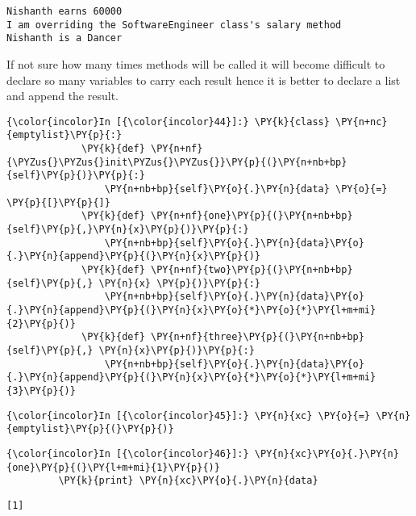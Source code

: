    \begin{Verbatim}[commandchars=\\\{\}]
Nishanth earns 60000
I am overriding the SoftwareEngineer class's salary method
Nishanth is a Dancer
    \end{Verbatim}

    If not sure how many times methods will be called it will become
difficult to declare so many variables to carry each result hence it is
better to declare a list and append the result.

    \begin{Verbatim}[commandchars=\\\{\}]
{\color{incolor}In [{\color{incolor}44}]:} \PY{k}{class} \PY{n+nc}{emptylist}\PY{p}{:}
             \PY{k}{def} \PY{n+nf}{\PYZus{}\PYZus{}init\PYZus{}\PYZus{}}\PY{p}{(}\PY{n+nb+bp}{self}\PY{p}{)}\PY{p}{:}
                 \PY{n+nb+bp}{self}\PY{o}{.}\PY{n}{data} \PY{o}{=} \PY{p}{[}\PY{p}{]}
             \PY{k}{def} \PY{n+nf}{one}\PY{p}{(}\PY{n+nb+bp}{self}\PY{p}{,}\PY{n}{x}\PY{p}{)}\PY{p}{:}
                 \PY{n+nb+bp}{self}\PY{o}{.}\PY{n}{data}\PY{o}{.}\PY{n}{append}\PY{p}{(}\PY{n}{x}\PY{p}{)}
             \PY{k}{def} \PY{n+nf}{two}\PY{p}{(}\PY{n+nb+bp}{self}\PY{p}{,} \PY{n}{x} \PY{p}{)}\PY{p}{:}
                 \PY{n+nb+bp}{self}\PY{o}{.}\PY{n}{data}\PY{o}{.}\PY{n}{append}\PY{p}{(}\PY{n}{x}\PY{o}{*}\PY{o}{*}\PY{l+m+mi}{2}\PY{p}{)}
             \PY{k}{def} \PY{n+nf}{three}\PY{p}{(}\PY{n+nb+bp}{self}\PY{p}{,} \PY{n}{x}\PY{p}{)}\PY{p}{:}
                 \PY{n+nb+bp}{self}\PY{o}{.}\PY{n}{data}\PY{o}{.}\PY{n}{append}\PY{p}{(}\PY{n}{x}\PY{o}{*}\PY{o}{*}\PY{l+m+mi}{3}\PY{p}{)}
\end{Verbatim}

    \begin{Verbatim}[commandchars=\\\{\}]
{\color{incolor}In [{\color{incolor}45}]:} \PY{n}{xc} \PY{o}{=} \PY{n}{emptylist}\PY{p}{(}\PY{p}{)}
\end{Verbatim}

    \begin{Verbatim}[commandchars=\\\{\}]
{\color{incolor}In [{\color{incolor}46}]:} \PY{n}{xc}\PY{o}{.}\PY{n}{one}\PY{p}{(}\PY{l+m+mi}{1}\PY{p}{)}
         \PY{k}{print} \PY{n}{xc}\PY{o}{.}\PY{n}{data}
\end{Verbatim}

    \begin{Verbatim}[commandchars=\\\{\}]
[1]
    \end{Verbatim}

